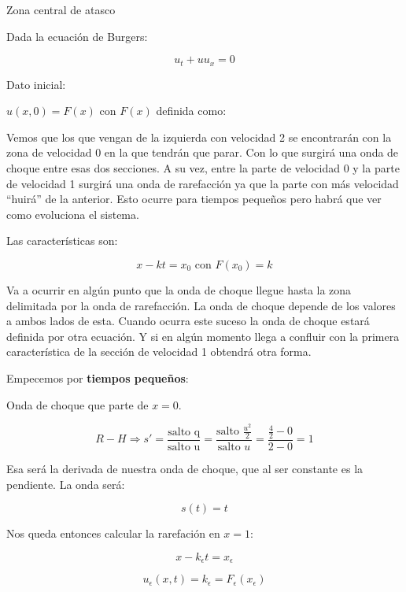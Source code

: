 		\begin{example}{Zona central de atasco}

			Dada la ecuación de Burgers:

			$$u_t + u u_x = 0$$

			Dato inicial:

			$u(x,0) = F(x)$ con $F(x)$ definida como:

			\begin{figure}[hbtp]
				\centering
				\caption{}
				\label{fig:FTresVelocidades}
			\end{figure}



			Vemos que los que vengan de la izquierda con velocidad 2 se encontrarán con la zona de velocidad 0 en la que tendrán que parar. Con lo que surgirá una onda de choque entre esas dos secciones. A su vez, entre la parte de velocidad 0 y la parte de velocidad 1 surgirá una onda de rarefacción ya que la parte con más velocidad ``huirá'' de la anterior. Esto ocurre para tiempos pequeños pero habrá que ver como evoluciona el sistema.

			Las características son:

			$$x - kt = x_0 \text{ con } F(x_0) = k$$

			Va a ocurrir en algún punto que la onda de choque llegue hasta la zona delimitada por la onda de rarefacción. La onda de choque depende de los valores a ambos lados de esta. Cuando ocurra este suceso la onda de choque estará definida por otra ecuación. Y si en algún momento llega a confluir con la primera característica de la sección de velocidad 1 obtendrá otra forma.


			Empecemos por \textbf{tiempos pequeños}:

			Onda de choque que parte de $x=0$.

			$$R-H \Rightarrow s' = \frac{\text{salto q}}{\text{salto u}} = \frac{\text{salto }\frac{u^2}{2}}{\text{salto }u} = \frac{\frac{4}{2} - 0}{2-0} = 1 $$

			Esa será la derivada de nuestra onda de choque, que al ser constante es la pendiente. La onda será:

			$$s(t) = t$$

			Nos queda entonces calcular la rarefación en $x=1$:

			$$x-k_\epsilon t = x_\epsilon$$

			$$u_\epsilon (x,t) = k_\epsilon = F_\epsilon (x_\epsilon)$$


\end{example}
